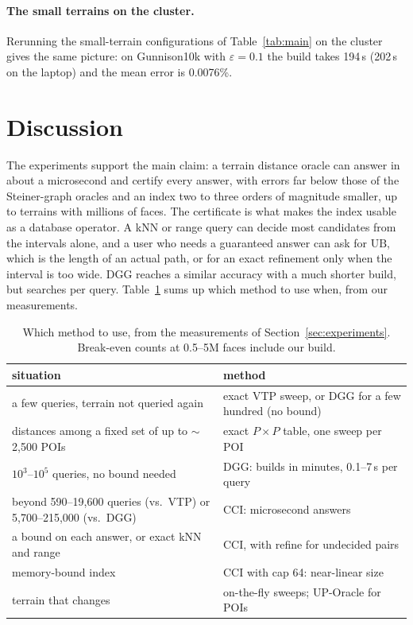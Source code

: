 \documentclass[sigconf,nonacm,screen]{acmart}
\newcommand{\cci}{CCI\xspace}
\newcommand{\UB}{\mathrm{UB}}
\newcommand{\eps}{\varepsilon}
\begin{document}
\paragraph{The small terrains on the cluster.}
Rerunning the small-terrain configurations of Table~\ref{tab:main} on the cluster gives the same picture: on
Gunnison10k with $\eps=0.1$ the build takes 194\,s (202\,s on the laptop) and the mean error is 0.0076\%.

\section{Discussion}
\label{sec:discussion}

The experiments support the main claim: a terrain distance oracle can answer in about a microsecond and
certify every answer, with errors far below those of the Steiner-graph oracles and an index two to three orders
of magnitude smaller, up to terrains with millions of faces. The certificate is what makes the index usable as a database operator. A kNN or range query can
decide most candidates from the intervals alone, and a user who needs a guaranteed answer can ask for $\UB$, which is
the length of an actual path, or for an exact refinement only when the interval is too wide. DGG reaches a similar
accuracy with a much shorter build, but searches per query. Table~\ref{tab:guide} sums up which method to use when, from our measurements.

\begin{table}[t]
\caption{Which method to use, from the measurements of Section~\ref{sec:experiments}. Break-even counts at 0.5--5M
faces include our build.}
\label{tab:guide}
\small
\setlength{\tabcolsep}{3pt}
\begin{tabular}{@{}p{}p{}@{}}
\toprule
situation & method\\
\midrule
a few queries, terrain not queried again & exact VTP sweep, or DGG for a few hundred (no bound)\\
distances among a fixed set of up to $\sim$2,500 POIs & exact $P\times P$ table, one sweep per POI\\
$10^3$--$10^5$ queries, no bound needed & DGG: builds in minutes, 0.1--7\,s per query\\
beyond 590--19,600 queries (vs.\ VTP) or 5,700--215,000 (vs.\ DGG) & \cci: microsecond answers\\
a bound on each answer, or exact kNN and range & \cci, with refine for undecided pairs\\
memory-bound index & \cci with cap 64: near-linear size\\
terrain that changes & on-the-fly sweeps; UP-Oracle for POIs\\
\bottomrule
\end{tabular}
\end{table}
\end{document}
